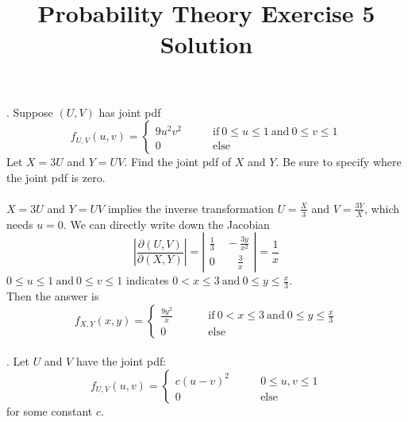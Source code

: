 \documentclass[onecolumn, 12pt]{IEEEtran}
\title{Probability Theory Exercise 5 Solution}
\begin{document}
\maketitle
{}. Suppose $(U, V)$ has joint pdf
\begin{equation*}
f_{U,V}(u,v)=\left\{
\begin{aligned}
9u^2v^2 &\qquad\mathrm{if} \ 0 \le u \le 1 \ \mathrm{and}\  0 \le v \le 1\\
0 \quad&\qquad\mathrm{else}
\end{aligned}
\right.
\end{equation*}
Let $X=3U$ and $Y = UV$. Find the joint pdf of $X$ and $Y$. Be sure to specify where the joint pdf is zero.\\
\noindent
\vspace*{0.1in}\\
 $X=3U$ and $Y = UV$ implies the inverse transformation $U=\frac{X}{3}$ and $V=\frac{3Y}{X}$, which needs $u=0$. We can directly write down the Jacobian
\begin{equation*}
\left|\frac{\partial(U,V)}{\partial(X,Y)}\right|=\left|\begin{aligned}\frac 13 & \ -\frac{3y}{x^2}\\ 0 & \quad\ \frac{3}{x} \end{aligned}\right|=\frac{1}{x}
\end{equation*}
$0 \le u \le 1 \ \mathrm{and}\  0 \le v \le 1$ indicates $0 < x \le 3 \ \mathrm{and}\   0\le y\le \frac{x}{3}$.\\
Then the answer is 
\begin{equation*}
f_{X,Y}(x,y)=\left\{
\begin{aligned}
\frac{9y^2}{x} &\qquad\mathrm{if} \ 0 < x \le 3 \ \mathrm{and}\   0\le y\le \frac{x}{3}\\
0 \quad&\qquad\mathrm{else}
\end{aligned}
\right.
\end{equation*}
\noindent 
\vspace*{0.3in}\\
. Let $U$ and $V$ have the joint pdf:
\begin{equation*}
f_{U,V}(u,v)=\left\{
\begin{aligned}
c(u-v)^2 &\qquad 0 \le u, v \le 1\\
0 \qquad&\qquad\mathrm{else}
\end{aligned}
\right.
\end{equation*}
for some constant $c$.\\
\end{document}

